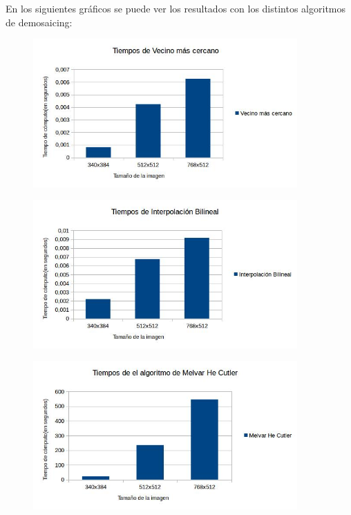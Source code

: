 \documentclass[10pt, a4paper]{article}
\begin{document}
En los siguientes gr\'aficos se puede ver los resultados con los distintos algoritmos de demosaicing:

\begin{figure}[H]
  \centering
    \includegraphics[width=0.9\textwidth]{vecino}
\end{figure}

\begin{figure}[H]
  \centering
    \includegraphics[width=0.9\textwidth]{Bilineal}
\end{figure}

\begin{figure}[H]
  \centering
    \includegraphics[width=0.9\textwidth]{MHC}
\end{figure}
\end{document}
